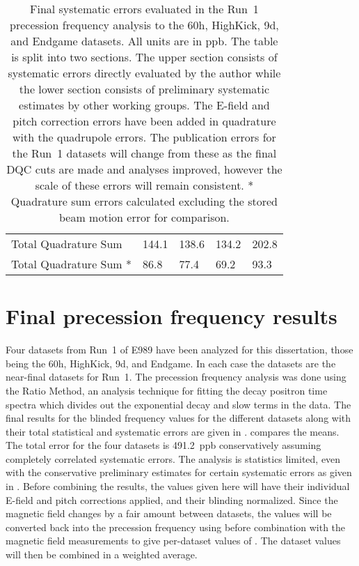 \begin{table}
\begin{tabular*}{\linewidth}{@{\extracolsep{\fill}}lGGGG}
  \hline\hline
    Total Quadrature Sum & 144.1 & 138.6 & 134.2 & 202.8 \\
    Total Quadrature Sum * & 86.8 & 77.4 & 69.2 & 93.3 \\
  \hline
\end{tabular*}
\caption[Systematic errors evaluated in the Run~1 precession frequency datasets]{Final systematic errors evaluated in the Run~1 precession frequency analysis to the 60h, HighKick, 9d, and Endgame datasets. All units are in ppb. The table is split into two sections. The upper section consists of systematic errors directly evaluated by the author while the lower section consists of preliminary systematic estimates by other working groups. The E-field and pitch correction errors have been added in quadrature with the quadrupole errors. The publication errors for the Run~1 datasets will change from these as the final DQC cuts are made and analyses improved, however the scale of these errors will remain consistent. * Quadrature sum errors calculated excluding the stored beam motion error for comparison.}
\label{tab:FinalSystematicErrors}
\end{table}


\clearpage

\section{Final precession frequency results}


Four datasets from Run~1 of E989 have been analyzed for this dissertation, those being the 60h, HighKick, 9d, and Endgame. In each case the datasets are the near-final datasets for Run~1. The precession frequency analysis was done using the Ratio Method, an analysis technique for fitting the decay positron time spectra which divides out the exponential decay and slow terms in the data. The final results for the blinded frequency \R values for the different datasets along with their total statistical and systematic errors are given in .  compares the means. The total error for the four datasets is \SI{491.2}{ppb} conservatively assuming completely correlated systematic errors. The analysis is statistics limited, even with the conservative preliminary estimates for certain systematic errors as given in . Before combining the results, the \R values given here will have their individual E-field and pitch corrections applied, and their blinding normalized. Since the magnetic field changes by a fair amount between datasets, the \R values will be converted back into the precession frequency \wa using  before combination with the magnetic field measurements to give per-dataset values of \amu. The dataset \amu values will then be combined in a weighted average.



